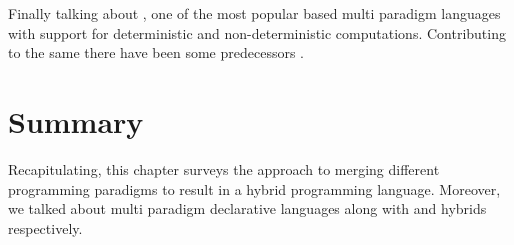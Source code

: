 \documentclass[thesis-solanki.tex]{subfiles}
\begin{document}
Finally talking about , one of the most popular  based multi paradigm languages
with support for deterministic and non-deterministic computations. Contributing to the same there have been some
predecessors \cite{website:alf,website:toy}.        


\section{Summary}
Recapitulating, this chapter surveys the approach to merging different programming paradigms to result in a hybrid
programming language.
Moreover, we talked about multi paradigm declarative languages along with  and 
hybrids respectively.


\ifMain\ifDraft
\begin{scope}
  \nolinenumbers
  \enotesize
  \par
  \begin{singlespace}
  \setlength{\parskip}{12pt plus 2pt minus 1pt}
  \theendnotes
  \par
  \end{singlespace}
\end{scope}
\fi\fi
\end{document}
